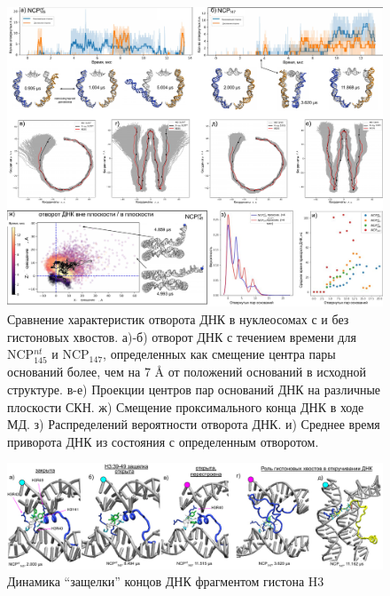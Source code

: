 \begin{figure} [H]
    \centering
    \includegraphics[width=\textwidth]{images/p2/10ms/fig2.pdf}
    \caption[Сравнение характеристик отворота ДНК в нуклеосомах с и без гистоновых хвостов]{Сравнение характеристик отворота ДНК в нуклеосомах с и без гистоновых хвостов. а)-б) отворот ДНК с течением времени для NCP$^{nt}_{145}$ и NCP$_{147}$, определенных как смещение центра пары оснований более, чем на 7 \AA{} от положений оснований в исходной структуре. в-е) Проекции центров пар оснований ДНК на различные плоскости СКН. ж) Смещение проксимального конца ДНК в ходе МД. з) Распределений вероятности отворота ДНК. и) Среднее время приворота ДНК из состояния с определенным отворотом.}
    \label{fig:p2_3:f2}
\end{figure}





\begin{figure}[H]
    \centering
    \includegraphics[width=\textwidth]{images/p2/10ms/fig3.pdf}
    \caption[Динамика ``защелки'' концов ДНК фрагментом гистона H3]{Динамика ``защелки'' концов ДНК фрагментом гистона H3}
    \label{fig:p2_3:f3}
\end{figure}



